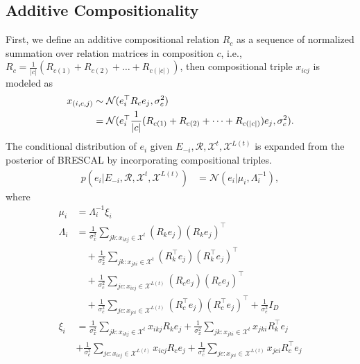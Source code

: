 \subsection{Additive Compositionality}
First, we define an additive compositional relation $R_c$ as a sequence of normalized summation over 
relation matrices in composition $c$, i.e.,
$R_{{c}} = \frac{1}{|c|}(R_{c(1)} + R_{c(2)} + \dots + R_{c(|c|)})$, then compositional triple $x_{icj}$ 
is modeled as
\begin{align}
x_{(i, c, j)} &\sim \mathcal{N}(e_i^\top R_c e_j, \sigma_{c}^2) \\
&= \mathcal{N}(e_i^\top \frac{1}{|c|}(R_{c(1)} + R_{c(2)} + \dots + R_{c(|c|)}) e_j, \sigma_{c}^2). \notag
\end{align}
The conditional distribution of $e_i$ given $E_{-i}, \mathcal{R}, \mathcal{X}^{t}, \mathcal{X}^{L(t)}$ is  
expanded from the posterior of BRESCAL by incorporating compositional triples.
\begin{align} \label{eqn:comp_sample_e}
p(e_i |E_{-i}, \mathcal{R}, \mathcal{X}^{t}, \mathcal{X}^{L(t)}) &= \mathcal{N}(e_i | \mu_i, \Lambda_i^{-1}),
\end{align}
where
\begin{align*}
\mu_i &= \Lambda_i^{-1}\xi_i \\
\Lambda_i &= \frac{1}{\sigma_x^2} \sum_{jk : x_{ikj} \in \mathcal{X}^{t}} (R_k e_j)(R_k e_j)^\top \\
&\quad+ \frac{1}{\sigma_x^2} \sum_{jk : x_{jki} \in \mathcal{X}^{t}} (R_k^\top e_j)(R_k^\top e_j)^\top \\
&\quad + \frac{1}{\sigma_c^2} \sum_{jc : x_{icj} \in \mathcal{X}^{L(t)}} (R_c e_j)(R_c e_j)^\top \\
&\quad+ \frac{1}{\sigma_c^2} \sum_{jc : x_{jci} \in \mathcal{X}^{L(t)}} (R_c^\top e_j)(R_c^\top e_j)^\top + 
\frac{1}{\sigma_e^2} {I}_D \\
\xi_i &= \frac{1}{\sigma_x^2}\sum_{jk : x_{ikj} \in \mathcal{X}^{t}}  x_{ikj} R_{k} e_{j} + \frac{1}
{\sigma_x^2}\sum_{jk : x_{jki} \in \mathcal{X}^{t}} x_{jki} R_{k}^\top e_{j} \\
& + \frac{1}{\sigma_c^2}\sum_{jc : x_{icj} \in \mathcal{X}^{L(t)}}  x_{icj} R_{c} e_{j} + \frac{1}
{\sigma_c^2}\sum_{jc : x_{jci} \in \mathcal{X}^{L(t)}} x_{jci} R_{c}^\top e_{j}
\end{align*}

